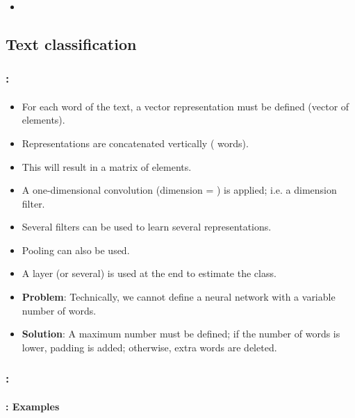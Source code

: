 \documentclass[xcolor=table]{beamer}
\begin{document}
\begin{frame}
	\frametitle{\insertshortsubtitle}
	\framesubtitle{\insertsection}
	
	\begin{itemize}
		\item 
	\end{itemize}
	
\end{frame}

\subsection{Text classification}

\begin{frame}
	\frametitle{\insertshortsubtitle: \insertsection}
	\framesubtitle{\insertsubsection}
	
	\begin{itemize}
			\item For each word of the text, a vector representation must be defined (vector of  elements).
			\item Representations are concatenated vertically ( words).
			\item This will result in a matrix of  elements.
			\item A one-dimensional convolution (dimension = ) is applied; i.e. a  dimension filter.
			\item Several filters can be used to learn several representations.
			\item Pooling can also be used.
			\item A  layer (or several) is used at the end to estimate the class.
			\item \textbf{Problem}: Technically, we cannot define a neural network with a variable number of words.
			\item \textbf{Solution}: \textcolor{yellow!30}{A maximum number must be defined; if the number of words is lower, padding is added; otherwise, extra words are deleted.}
		\end{itemize}
	
\end{frame}

\begin{frame}
	\frametitle{\insertshortsubtitle: \insertsection}
	\framesubtitle{\insertsubsection: Examples}
	
	
\end{frame}
\end{document}
